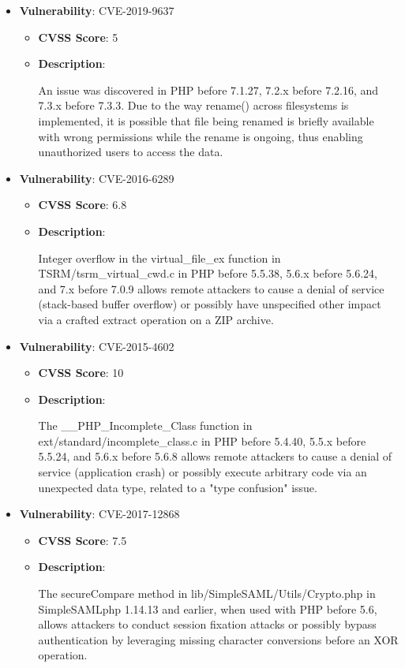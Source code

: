 \documentclass{article}
\begin{document}
\begin{itemize}
        \item \textbf{Vulnerability}: CVE-2019-9637
        \begin{itemize}
            \item \textbf{CVSS Score}:  5 
            \item \textbf{Description}:
            \parbox[t]{0.9\linewidth}{
                \ttfamily An issue was discovered in PHP before 7.1.27, 7.2.x before 7.2.16, and 7.3.x before 7.3.3. Due to the way rename() across filesystems is implemented, it is possible that file being renamed is briefly available with wrong permissions while the rename is ongoing, thus enabling unauthorized users to access the data.
            }
        \end{itemize}
    
        \item \textbf{Vulnerability}: CVE-2016-6289
        \begin{itemize}
            \item \textbf{CVSS Score}:  6.8 
            \item \textbf{Description}:
            \parbox[t]{0.9\linewidth}{
                \ttfamily Integer overflow in the virtual\_file\_ex function in TSRM/tsrm\_virtual\_cwd.c in PHP before 5.5.38, 5.6.x before 5.6.24, and 7.x before 7.0.9 allows remote attackers to cause a denial of service (stack-based buffer overflow) or possibly have unspecified other impact via a crafted extract operation on a ZIP archive.
            }
        \end{itemize}
    
        \item \textbf{Vulnerability}: CVE-2015-4602
        \begin{itemize}
            \item \textbf{CVSS Score}:  10 
            \item \textbf{Description}:
            \parbox[t]{0.9\linewidth}{
                \ttfamily The \_\_PHP\_Incomplete\_Class function in ext/standard/incomplete\_class.c in PHP before 5.4.40, 5.5.x before 5.5.24, and 5.6.x before 5.6.8 allows remote attackers to cause a denial of service (application crash) or possibly execute arbitrary code via an unexpected data type, related to a "type confusion" issue.
            }
        \end{itemize}
    
        \item \textbf{Vulnerability}: CVE-2017-12868
        \begin{itemize}
            \item \textbf{CVSS Score}:  7.5 
            \item \textbf{Description}:
            \parbox[t]{0.9\linewidth}{
                \ttfamily The secureCompare method in lib/SimpleSAML/Utils/Crypto.php in SimpleSAMLphp 1.14.13 and earlier, when used with PHP before 5.6, allows attackers to conduct session fixation attacks or possibly bypass authentication by leveraging missing character conversions before an XOR operation.
            }
        \end{itemize}
    

\end{itemize}
\end{document}
